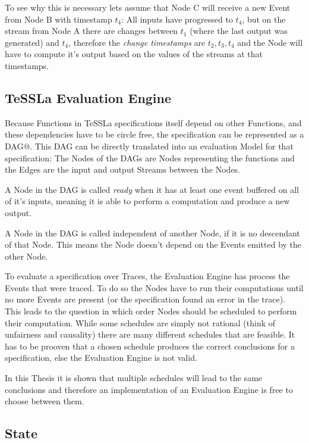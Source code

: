 To see why this is necessary lets assume that Node C will receive a new Event from Node B with timestamp \(t_4\):
All inputs have progressed to \(t_4\), but on the stream from Node A there are changes between \(t_1\) (where the last output was generated) and \(t_4\),
therefore the \emph{change timestamps} are \(t_2, t_3, t_4\) and the Node will have to compute it's output based on the values of the streams at that timestamps.

\subsection{TeSSLa Evaluation Engine}
\label{sec:concepts:def:model}

Because Functions in TeSSLa specifications itself depend on other Functions, and these dependencies have to be circle free,
the specification can be represented as a DAG@.
This DAG can be directly translated into an evaluation Model for that specification: The Nodes of the DAGs are Nodes representing the functions and the Edges are the input and output Streams between the Nodes.

A Node in the DAG is called \emph{ready} when it has at least one event buffered on all of it's inputs, meaning it is able to perform a computation and produce a new output.

A Node in the DAG is called independent of another Node, if it is no descendant of that Node.
This means the Node doesn't depend on the Events emitted by the other Node.

To evaluate a specification over Traces, the Evaluation Engine has process the Events that were traced.
To do so the Nodes have to run their computations until no more Events are present (or the specification found an error in the trace).
This leads to the question in which order Nodes should be scheduled to perform their computation.
While some schedules are simply not rational (think of unfairness and causality) there are many different schedules that are feasible.
It has to be prooven that a chosen schedule produces the correct conclusions for a specification, else the Evaluation Engine is not valid.

In this Thesis it is shown that multiple schedules will lead to the same conclusions and therefore an implementation of an Evaluation Engine is free to choose between them.

\subsection{State}
\label{sec:concepts:def:state}

